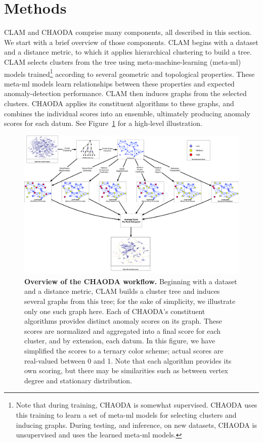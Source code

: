 \section{Methods}
\label{sec:methods}

CLAM and CHAODA comprise many components, all described in this section.
We start with a brief overview of those components.
CLAM begins with a dataset and a distance metric, to which it applies hierarchical clustering to build a tree.
CLAM selects clusters from the tree using meta-machine-learning (meta-ml) models trained\footnote{Note that during training, CHAODA is somewhat supervised.
CHAODA uses this training to learn a set of meta-ml models for selecting clusters and inducing graphs.
During testing, and inference, on new datasets, CHAODA is unsupervised and uses the learned meta-ml models.} according to several geometric and topological properties.
These meta-ml models learn relationships between these properties and expected anomaly-detection performance.
CLAM then induces graphs from the selected clusters.
CHAODA applies its constituent algorithms to these graphs, and combines the individual scores into an ensemble, ultimately producing anomaly scores for each datum.
See Figure~\ref{fig:methods:chaoda-workflow} for a high-level illustration.


\begin{figure}[ht!]
    \centering
    \includegraphics[width=6in]{images/chaoda-workflow.pdf}
    \caption{\textbf{Overview of the CHAODA workflow.}
        Beginning with a dataset and a distance metric, CLAM builds a cluster tree and induces several graphs from this tree; for the sake of simplicity, we illustrate only one such graph here.
        Each of CHAODA's constituent algorithms provides distinct anomaly scores on its graph.
        These scores are normalized and aggregated into a final score for each cluster, and by extension, each datum.
        In this figure, we have simplified the scores to a ternary color scheme; actual scores are real-valued between 0 and 1.
        Note that each algorithm provides its own scoring, but there may be similarities such as between vertex degree and stationary distribution.}
    \label{fig:methods:chaoda-workflow}
\end{figure}

